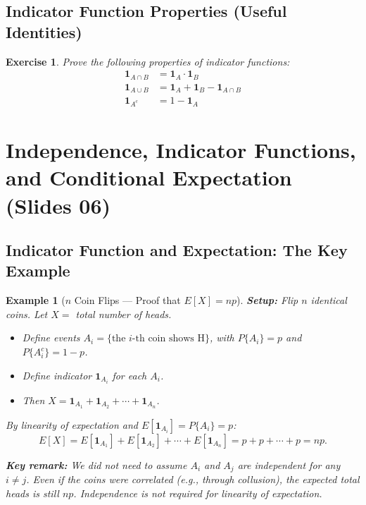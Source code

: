 \documentclass[12pt]{article}
\theoremstyle{definition_style}
\newtheorem{example}[defn]{Example}
\newtheorem{exercise}[defn]{Exercise}
\begin{document}
\subsection{Indicator Function Properties (Useful Identities)}

\begin{exercise}
Prove the following properties of indicator functions:
\begin{align}
    \mathbf{1}_{A \cap B} &= \mathbf{1}_A \cdot \mathbf{1}_B \\
    \mathbf{1}_{A \cup B} &= \mathbf{1}_A + \mathbf{1}_B - \mathbf{1}_{A \cap B} \\
    \mathbf{1}_{A^c}      &= 1 - \mathbf{1}_A
\end{align}
\end{exercise}

\newpage
\section{Independence, Indicator Functions, and Conditional Expectation (Slides 06)}

\subsection{Indicator Function and Expectation: The Key Example}

\begin{example}[{$n$ Coin Flips --- Proof that $E[X] = np$}]
\textbf{Setup:} Flip $n$ identical coins. Let $X = $ total number of heads.
\begin{itemize}
    \item Define events $A_i = \{\text{the } i\text{-th coin shows H}\}$, with $P\{A_i\} = p$ and $P\{A_i^c\} = 1-p$.
    \item Define indicator $\mathbf{1}_{A_i}$ for each $A_i$.
    \item Then $X = \mathbf{1}_{A_1} + \mathbf{1}_{A_2} + \cdots + \mathbf{1}_{A_n}$.
\end{itemize}
By linearity of expectation and $E[\mathbf{1}_{A_i}] = P\{A_i\} = p$:
\[
    E[X] = E[\mathbf{1}_{A_1}] + E[\mathbf{1}_{A_2}] + \cdots + E[\mathbf{1}_{A_n}] = p + p + \cdots + p = np.
\]

\textbf{Key remark:} We did \emph{not} need to assume $A_i$ and $A_j$ are independent for any $i \ne j$. Even if the coins were correlated (e.g., through collusion), the expected total heads is still $np$. Independence is not required for linearity of expectation.
\end{example}
\end{document}
